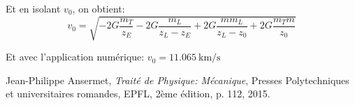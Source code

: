 \documentclass[a4paper,12pt,twoside]{article}
\begin{document}
Et en isolant $v_0$, on obtient:
\begin{equation}
v_0 = \sqrt{-2G\frac{m_T}{z_E} - 2G\frac{m_L}{z_L - z_E} + 2G\frac{m m_L}{z_L - z_0} + 2G\frac{m_T m}{z_0}}
\end{equation}

Et avec l'application numérique: $v_0 = \SI{11.065}{\kilo\meter\per\second}$


\begin{thebibliography}{99}

	Jean-Philippe Ansermet,
	\textit{Traité de Physique: Mécanique},
	Presses Polytechniques et universitaires romandes, EPFL,
	2ème édition,
	p. 112,
	2015.


\end{thebibliography}
\end{document}
